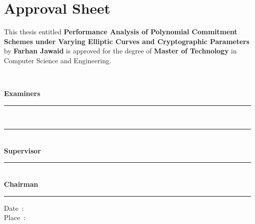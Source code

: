 \chapter*{Approval Sheet}

\vspace{1em}

\noindent
This thesis entitled \textbf{Performance Analysis of Polynomial
Commitment Schemes under Varying Elliptic Curves and Cryptographic
Parameters} by \textbf{Farhan Jawaid} is approved for the degree of
\textbf{Master of Technology} in Computer Science and Engineering.

\vspace{2em}

\begin{minipage}[t]{0.45\textwidth}
\vspace{0pt}
~
\end{minipage}
\hfill
\begin{minipage}[t]{0.45\textwidth}
\vspace{0pt}
\raggedleft
\textbf{Examiners}\\[2.2em]
\rule{5.5cm}{0.4pt}\\[2.2em]
\rule{5.5cm}{0.4pt}\\[2.8em]
\textbf{Supervisor}\\[2.2em]
\rule{5.5cm}{0.4pt}\\[2.8em]
\textbf{Chairman}\\[2.2em]
\rule{5.5cm}{0.4pt}
\end{minipage}

\vspace{3em}

\noindent
\begin{minipage}[t]{0.45\textwidth}
\noindent Date~: \underline{\hspace{3cm}}\\[1.5em]
\noindent Place~: \underline{\hspace{3cm}}
\end{minipage}